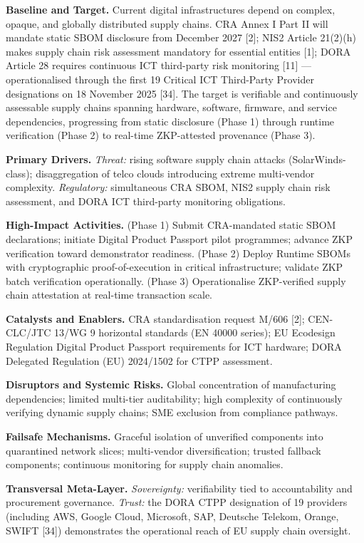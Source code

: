 \documentclass{ieeeaccess}
\begin{document}
\textbf{Baseline and Target.} Current digital infrastructures depend on
complex, opaque, and globally distributed supply chains. CRA Annex I
Part II will mandate static SBOM disclosure from December 2027 {[}2{]};
NIS2 Article 21(2)(h) makes supply chain risk assessment mandatory for
essential entities {[}1{]}; DORA Article 28 requires continuous ICT
third-party risk monitoring {[}11{]} --- operationalised through the
first 19 Critical ICT Third-Party Provider designations on 18 November
2025 {[}34{]}. The target is verifiable and continuously assessable
supply chains spanning hardware, software, firmware, and service
dependencies, progressing from static disclosure (Phase 1) through
runtime verification (Phase 2) to real-time ZKP-attested provenance
(Phase 3).

\textbf{Primary Drivers.} \emph{Threat:} rising software supply chain
attacks (SolarWinds-class); disaggregation of telco clouds introducing
extreme multi-vendor complexity. \emph{Regulatory:} simultaneous CRA
SBOM, NIS2 supply chain risk assessment, and DORA ICT third-party
monitoring obligations.

\textbf{High-Impact Activities.} (Phase 1) Submit CRA-mandated static
SBOM declarations; initiate Digital Product Passport pilot programmes;
advance ZKP verification toward demonstrator readiness. (Phase 2) Deploy
Runtime SBOMs with cryptographic proof-of-execution in critical
infrastructure; validate ZKP batch verification operationally. (Phase 3)
Operationalise ZKP-verified supply chain attestation at real-time
transaction scale.

\textbf{Catalysts and Enablers.} CRA standardisation request M/606
{[}2{]}; CEN-CLC/JTC 13/WG 9 horizontal standards (EN 40000 series); EU
Ecodesign Regulation Digital Product Passport requirements for ICT
hardware; DORA Delegated Regulation (EU) 2024/1502 for CTPP assessment.

\textbf{Disruptors and Systemic Risks.} Global concentration of
manufacturing dependencies; limited multi-tier auditability; high
complexity of continuously verifying dynamic supply chains; SME
exclusion from compliance pathways.

\textbf{Failsafe Mechanisms.} Graceful isolation of unverified
components into quarantined network slices; multi-vendor
diversification; trusted fallback components; continuous monitoring for
supply chain anomalies.

\textbf{Transversal Meta-Layer.} \emph{Sovereignty:} verifiability tied
to accountability and procurement governance. \emph{Trust:} the DORA
CTPP designation of 19 providers (including AWS, Google Cloud,
Microsoft, SAP, Deutsche Telekom, Orange, SWIFT {[}34{]}) demonstrates
the operational reach of EU supply chain oversight.
\end{document}
